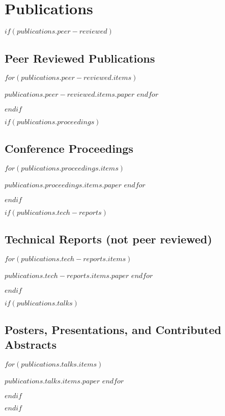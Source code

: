 \documentclass[letterpaper,10pt,final]{moderncv}
\begin{document}
\section{Publications}
$if(publications.peer-reviewed)$
\subsection{Peer Reviewed Publications}
\vspace*{0.25em}
\begin{list}{}{\leftmargin=1em \itemindent=-1em \itemsep=0.25em}
$for(publications.peer-reviewed.items)$
\item $publications.peer-reviewed.items.paper$
$endfor$
\end{list}
$endif$

$if(publications.proceedings)$
\subsection{Conference Proceedings}
\vspace*{0.25em}
\begin{list}{}{\leftmargin=1em \itemindent=-1em \itemsep=0.25em}
$for(publications.proceedings.items)$
\item $publications.proceedings.items.paper$
$endfor$
\end{list}
$endif$

$if(publications.tech-reports)$
\subsection{Technical Reports (not peer reviewed)}
\vspace*{0.25em}
\begin{list}{}{\leftmargin=1em \itemindent=-1em \itemsep=0.25em}
$for(publications.tech-reports.items)$
\item $publications.tech-reports.items.paper$
$endfor$
\end{list}
$endif$

$if(publications.talks)$
\subsection{Posters, Presentations, and Contributed Abstracts}
\vspace*{0.25em}
\begin{list}{}{\leftmargin=1em \itemindent=-1em \itemsep=0.25em}
$for(publications.talks.items)$
\item $publications.talks.items.paper$
$endfor$
\end{list}
$endif$

$endif$


\end{document}
